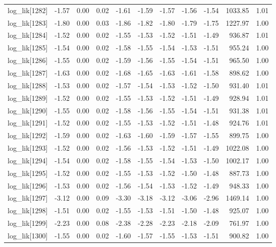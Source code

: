 \begin{table}[ht]
\begin{tabular}{rrrrrrrrrrr}
  log\_lik[1282] & -1.57 & 0.00 & 0.02 & -1.61 & -1.59 & -1.57 & -1.56 & -1.54 & 1033.85 & 1.01 \\ 
  log\_lik[1283] & -1.80 & 0.00 & 0.03 & -1.86 & -1.82 & -1.80 & -1.79 & -1.75 & 1227.97 & 1.00 \\ 
  log\_lik[1284] & -1.52 & 0.00 & 0.02 & -1.55 & -1.53 & -1.52 & -1.51 & -1.49 & 936.87 & 1.01 \\ 
  log\_lik[1285] & -1.54 & 0.00 & 0.02 & -1.58 & -1.55 & -1.54 & -1.53 & -1.51 & 955.24 & 1.00 \\ 
  log\_lik[1286] & -1.55 & 0.00 & 0.02 & -1.59 & -1.56 & -1.55 & -1.54 & -1.51 & 965.50 & 1.00 \\ 
  log\_lik[1287] & -1.63 & 0.00 & 0.02 & -1.68 & -1.65 & -1.63 & -1.61 & -1.58 & 898.62 & 1.00 \\ 
  log\_lik[1288] & -1.53 & 0.00 & 0.02 & -1.57 & -1.54 & -1.53 & -1.52 & -1.50 & 931.40 & 1.01 \\ 
  log\_lik[1289] & -1.52 & 0.00 & 0.02 & -1.55 & -1.53 & -1.52 & -1.51 & -1.49 & 928.94 & 1.01 \\ 
  log\_lik[1290] & -1.55 & 0.00 & 0.02 & -1.58 & -1.56 & -1.55 & -1.54 & -1.51 & 931.38 & 1.01 \\ 
  log\_lik[1291] & -1.52 & 0.00 & 0.02 & -1.55 & -1.53 & -1.52 & -1.51 & -1.48 & 924.76 & 1.01 \\ 
  log\_lik[1292] & -1.59 & 0.00 & 0.02 & -1.63 & -1.60 & -1.59 & -1.57 & -1.55 & 899.75 & 1.00 \\ 
  log\_lik[1293] & -1.52 & 0.00 & 0.02 & -1.56 & -1.53 & -1.52 & -1.51 & -1.49 & 1022.08 & 1.00 \\ 
  log\_lik[1294] & -1.54 & 0.00 & 0.02 & -1.58 & -1.55 & -1.54 & -1.53 & -1.50 & 1002.17 & 1.00 \\ 
  log\_lik[1295] & -1.52 & 0.00 & 0.02 & -1.55 & -1.53 & -1.52 & -1.50 & -1.48 & 887.73 & 1.00 \\ 
  log\_lik[1296] & -1.53 & 0.00 & 0.02 & -1.56 & -1.54 & -1.53 & -1.52 & -1.49 & 948.33 & 1.00 \\ 
  log\_lik[1297] & -3.12 & 0.00 & 0.09 & -3.30 & -3.18 & -3.12 & -3.06 & -2.96 & 1469.14 & 1.00 \\ 
  log\_lik[1298] & -1.51 & 0.00 & 0.02 & -1.55 & -1.53 & -1.51 & -1.50 & -1.48 & 925.07 & 1.00 \\ 
  log\_lik[1299] & -2.23 & 0.00 & 0.08 & -2.38 & -2.28 & -2.23 & -2.18 & -2.09 & 761.97 & 1.00 \\ 
  log\_lik[1300] & -1.55 & 0.00 & 0.02 & -1.60 & -1.57 & -1.55 & -1.53 & -1.51 & 900.82 & 1.00 \\ 

\end{tabular}
\end{table}
